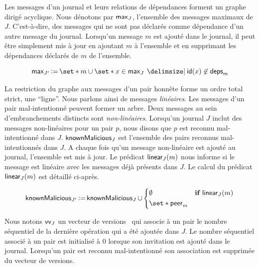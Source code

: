 Les messages d'un journal et leurs relations de dépendances forment un graphe dirigé acyclique.
Nous dénotons par $\operatorname{\mathsf{max}}_J$, l'ensemble des messages maximaux de $J$.
C'est-à-dire, des messages qui ne sont pas déclarés comme dépendance d'un autre message du journal.
Lorsqu'un message $m$ est ajouté dans le journal, il peut être simplement mis à jour en ajoutant $m$ à l'ensemble et en supprimant les dépendances déclarés de $m$ de l'ensemble.

\begin{equation*}
    \trm{max}_{J'} \assign \set*{m} \cup \set*{x \in \trm{max}_J \given \trm{id}(x) \not\in \trm{deps}_m}
\end{equation*}

La restriction du graphe aux messages d'un pair honnête forme un ordre total strict, une \enquote{ligne}.
Nous parlons ainsi de messages \emph{linéaires}.
Les messages d'un pair mal-intentionné peuvent former un arbre.
Deux messages au sein d'embranchements distincts sont \emph{non-linéaires}.
Lorsqu'un journal $J$ inclut des messages non-linéaires pour un pair $p$, nous disons que $p$ est reconnu mal-intentionné dans $J$.
$\operatorname{\mathsf{knownMalicious}}_J$ est l'ensemble des pairs reconnus mal-intentionnés dans $J$.
A chaque fois qu'un message non-linéaire est ajouté au journal, l'ensemble est mis à jour.
Le prédicat $\operatorname{\mathsf{linear}}_J(m)$ nous informe si le message est linéaire avec les messages déjà présents dans $J$.
Le calcul du prédicat $\operatorname{\mathsf{linear}}_J(m)$ est détaillé ci-après.

\begin{equation*}
    \trm{knownMalicious}_{J'} \assign \trm{knownMalicious}_J \cup \begin{dcases}
        \emptyset & \when \trm{linear}_J(m)\\
        \set*{\trm{peer}_m} &
    \end{dcases}
\end{equation*}

Nous notons $\operatorname{\mathsf{vv}}_J$ un vecteur de versions~\autocite{parker_1983_versionvector,mattern_1988_timevector} qui associe à un pair le nombre séquentiel de la dernière opération qui a été ajoutée dans $J$.
Le nombre séquentiel associé à un pair est initialisé à $0$ lorsque son invitation est ajouté dans le journal.
Lorsqu'un pair est reconnu mal-intentionné son association est supprimée du vecteur de versions.

